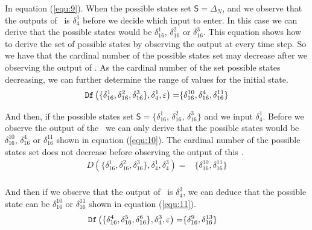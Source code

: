 \begin{example}
In equation (\ref{equ:9}). When the possible states set $\mathsf{S}=\Delta_N$, and  we observe that the outputs of \BCN\ is $\delta_4^1$ before we decide which input to enter. In this case we can derive that the possible states would be $\delta_{16}^1$, $\delta_{16}^2$ or  $\delta_{16}^3$. This equation shows how to derive the set of possible states by observing the output at every time step. So we have that the cardinal number of the possible states set may decrease after we observing the output of \BCN. As the cardinal number of the set possible states decreasing, we can further determine the range of values for the initial state. 
\begin{equation}
\begin{split}
{\tt Df}\left(\{\delta_{16}^1,\delta_{16}^2,\delta_{16}^3\},\delta_4^1,\varepsilon\right)=&\{\delta_{16}^{10},\delta_{16}^4,\delta_{16}^{11}\}\\
\end{split}
\label{equ:10}
\end{equation}

And then, if the possible states set $\mathsf{S}=\{\delta_{16}^1$, $\delta_{16}^2$, $\delta_{16}^3\}$ and we input $\delta_4^1$. Before we observe the output of the \BCN\ we can only derive that the possible states would be $\delta_{16}^{10}$, $\delta_{16}^4$ or  $\delta_{16}^{11}$ shown in equation (\ref{equ:10}). The cardinal number of the possible states set does not decrease before observing the output of this \BCN. %
\begin{equation}
\begin{split}
D\left(\{\delta_{16}^1,\delta_{16}^2,\delta_{16}^3\},\delta_4^1,\delta_4^3\right)=&\{\delta_{16}^{10},\delta_{16}^{11}\}\\
\end{split}
\label{equ:11}
\end{equation}

And then if we observe that the output of \BCN\ is $\delta_4^3$, we can deduce that the possible state can be $\delta_{16}^{10}$ or  $\delta_{16}^{11}$ shown in equation (\ref{equ:11}). 
\begin{equation}
\begin{split}
{\tt Df}\left(\{\delta_{16}^4,\delta_{16}^5,\delta_{16}^6\},\delta_4^3,\varepsilon\right)=&\{\delta_{16}^9,\delta_{16}^{13}\}
\end{split}
\label{equ:12}
\end{equation}


\end{example}
